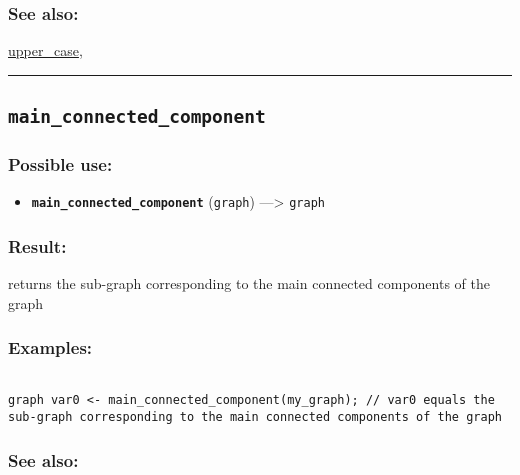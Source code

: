 \documentclass[]{book}
\providecommand{\tightlist}{%
  \setlength{\itemsep}{0pt}\setlength{\parskip}{0pt}}
\theoremstyle{definition}
\theoremstyle{definition}
\theoremstyle{definition}
\theoremstyle{remark}
\begin{document}
\subsubsection{See also:}\label{see-also-130}

\href{OperatorsSZ\#upper_case}{upper\_case},

\begin{center}\rule{0.5\linewidth}{\linethickness}\end{center}

\subsection{\texorpdfstring{\texttt{main\_connected\_component}}{main\_connected\_component}}\label{main_connected_component}

\subsubsection{Possible use:}\label{possible-use-332}

\begin{itemize}
\tightlist
\item
  \textbf{\texttt{main\_connected\_component}} (\texttt{graph})
  ---\textgreater{} \texttt{graph}
\end{itemize}

\subsubsection{Result:}\label{result-322}

returns the sub-graph corresponding to the main connected components of
the graph

\subsubsection{Examples:}\label{examples-230}

\begin{verbatim}
 
graph var0 <- main_connected_component(my_graph); // var0 equals the sub-graph corresponding to the main connected components of the graph
\end{verbatim}

\subsubsection{See also:}\label{see-also-131}
\end{document}
